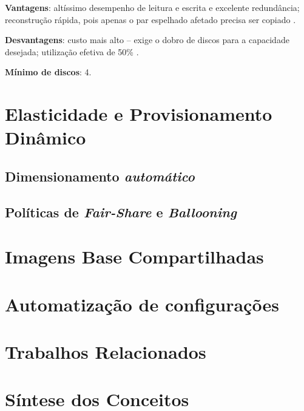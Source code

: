 \textbf{Vantagens}: altíssimo desempenho de leitura e escrita e excelente redundância; reconstrução rápida, pois apenas o par espelhado afetado precisa ser copiado \cite{techtarget2023}.

\textbf{Desvantagens}: custo mais alto – exige o dobro de discos para a capacidade desejada; utilização efetiva de 50\% \cite{techtarget2023}.

\textbf{Mínimo de discos}: 4.


\section{Elasticidade e Provisionamento Dinâmico}

\subsection{Dimensionamento \textit{automático}}

\subsection{Políticas de \textit{Fair-Share} e \textit{Ballooning}}

\section{Imagens Base Compartilhadas}

\section{Automatização de configurações}

\section{Trabalhos Relacionados}

\section{Síntese dos Conceitos}

